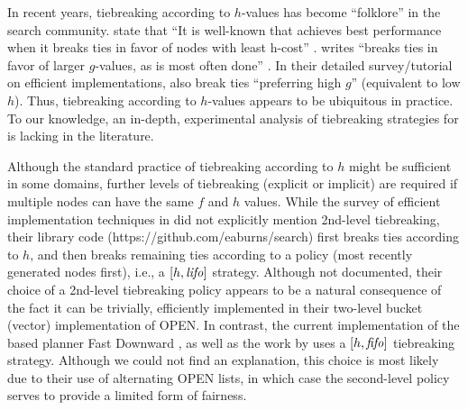 In recent years, tiebreaking according to $h$-values has become ``folklore'' in the search community.
\citeauthor{hansen2007anytime} state that ``It is well-known 
that \astar achieves best performance when it breaks ties
in favor of nodes with least h-cost'' \cite{hansen2007anytime}.
\citeauthor{holte2010common} writes ``\astar breaks ties in favor
of larger $g$-values, as is most often done'' \cite[note that since $f=g+h$,
preferring large $g$ is equivalent to preferring smaller $h$]{holte2010common}.
In their detailed survey/tutorial on efficient \astar implementations,
\citeauthor{burns2012implementing} \citeyear{burns2012implementing}
also break ties ``preferring high $g$'' (equivalent to low $h$).
Thus, tiebreaking according to $h$-values appears
to be ubiquitous in practice.
To our knowledge, an in-depth, experimental analysis of tiebreaking strategies for \astar is lacking in the literature.

Although the standard practice of tiebreaking according to $h$ might be
sufficient in some domains, further levels of tiebreaking (explicit or
implicit) are required if multiple nodes can have the same $f$ and
$h$ values.
While the survey of efficient \astar implementation techniques in
\cite{burns2012implementing} did not explicitly mention 2nd-level
tiebreaking, their library code ({\footnotesize https://github.com/eaburns/search})
first breaks ties according to $h$, and then
breaks remaining ties according to a \lifo policy (most recently
generated nodes first), i.e., a $[h,{\mbox{\textit{lifo}}}]$ strategy.
Although not documented, their choice of a \lifo 2nd-level tiebreaking policy appears to be a natural consequence of the fact it can be trivially, efficiently implemented in their two-level bucket (vector) implementation of OPEN.
In contrast, the current implementation of the \sota \astar based planner Fast
Downward \cite{Helmert2006}, %
as well as 
the work by \cite{RogerH10} uses a $[h,{\mbox{\textit{fifo}}}]$ tiebreaking strategy.
Although we could not find an explanation, this choice is most likely due to their use of alternating OPEN lists, in which case the \fifo second-level policy serves to provide a limited form of fairness.


